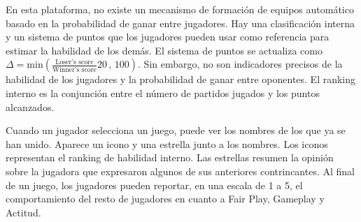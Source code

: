 \documentclass[a4paper,11pt]{book}
\theoremstyle{definition}
\begin{document}

En esta plataforma, no existe un mecanismo de formaci\'on de equipos automático basado en la probabilidad de ganar entre jugadores.
%
Hay una clasificaci\'on interna y un sistema de puntos que los jugadores pueden usar como referencia para estimar la habilidad de los demás.
%
El sistema de puntos se actualiza como {\small $\Delta = \text{min}(\frac{\text{Loser's score}}{\text{Winner's score}}20\,,\,100 )$}.
%
Sin embargo, no son indicadores precisos de la habilidad de los jugadores y la probabilidad de ganar entre oponentes.
%
El ranking interno es la conjunci\'on entre el n\'umero de partidos jugados y los puntos alcanzados.


Cuando un jugador selecciona un juego, puede ver los nombres de los que ya se han unido.
%
Aparece un icono y una estrella junto a los nombres.
%
Los iconos representan el ranking de habilidad interno.
%
Las estrellas resumen la opini\'on sobre la jugadora que expresaron algunos de sus anteriores contrincantes.
%
Al final de un juego, los jugadores pueden reportar, en una escala de 1 a 5, el comportamiento del resto de jugadores en cuanto a Fair Play, Gameplay y Actitud.
%
\end{document}
